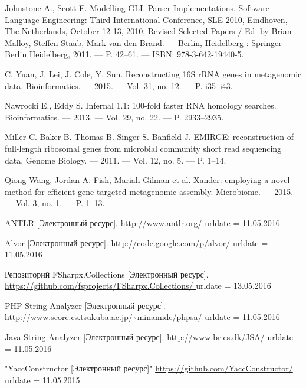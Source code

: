 \begin{thebibliography}{99}
  Johnstone A., Scott E.
  Modelling GLL Parser Implementations.
  Software Language Engineering: Third International Conference, SLE 2010, Eindhoven, The Netherlands, October 12-13, 2010, Revised Selected Papers / Ed. by Brian Malloy, Steffen Staab, Mark van den Brand. –– Berlin, Heidelberg : Springer Berlin Heidelberg, 2011. –– P. 42–61. –– ISBN: 978-3-642-19440-5.

  C. Yuan, J. Lei, J. Cole, Y. Sun.
  Reconstructing 16S rRNA genes in metagenomic data.
  Bioinformatics. –– 2015. –– Vol. 31, no. 12. –– P. i35–i43.
    
  Nawrocki E., Eddy S. 
  Infernal 1.1: 100-fold faster RNA homology searches.
  Bioinformatics. –– 2013. –– Vol. 29, no. 22. –– P. 2933–2935.

  Miller C. Baker B. Thomas B. Singer S. Banfield J.
  EMIRGE: reconstruction of full-length ribosomal genes from microbial community short read sequencing data.
  Genome Biology. –– 2011. –– Vol. 12, no. 5. –– P. 1–14.

  Qiong Wang, Jordan A. Fish, Mariah Gilman et al.
  Xander: employing a novel method for efficient gene-targeted metagenomic assembly.
  Microbiome. –– 2015. –– Vol. 3, no. 1. –– P. 1–13.
                                                     
  ANTLR [Электронный ресурс].
  \url{http://www.antlr.org/ }
  urldate = {11.05.2016}

  Alvor [Электронный ресурс].
  \url{ http://code.google.com/p/alvor/ }
  urldate = {11.05.2016}


  Репозиторий FSharpx.Collections [Электронный ресурс].
  \url{ https://github.com/fsprojects/FSharpx.Collections/ }
  urldate = {13.05.2016}

  PHP String Analyzer [Электронный ресурс].
  \url{ http://www.score.cs.tsukuba.ac.jp/~minamide/phpsa/ }
  urldate = {11.05.2016}

  Java String Analyzer [Электронный ресурс].
  \url{ http://www.brics.dk/JSA/ }
  urldate = {11.05.2016}


  "YaccConstructor [Электронный ресурс]"
  \url{https://github.com/YaccConstructor/ }
  urldate = {11.05.2015}


\end{thebibliography}
